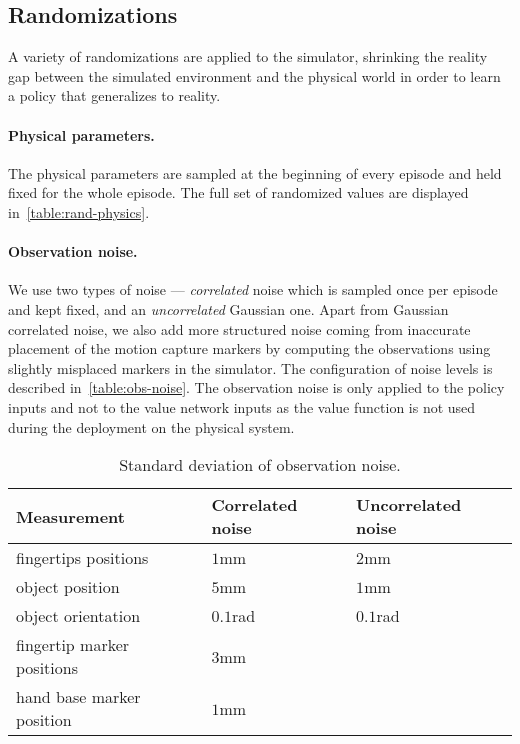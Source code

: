 \subsection{Randomizations}
\label{app:randomizations}

A variety of randomizations are applied to the simulator, shrinking the reality gap between the simulated environment and the physical world in order to learn a policy that generalizes to reality.


\paragraph{Physical parameters.}
The physical parameters are sampled at the beginning of every episode and held fixed for the whole episode. The full set of randomized values are displayed in~\autoref{table:rand-physics}.


\paragraph{Observation noise.}
We use two types of noise ---
\textit{correlated} noise which is sampled once per episode and kept fixed,
and an \textit{uncorrelated} Gaussian one.
Apart from Gaussian correlated noise, we also add more structured noise
coming from inaccurate placement of the motion capture markers
by computing the observations using slightly misplaced
markers in the simulator.
The configuration of noise levels is described in~\autoref{table:obs-noise}.
The observation noise is only applied to the policy inputs and not to
the value network inputs as the value function is not used during the deployment on the physical system.







\begin{table}
    \footnotesize
    \centering
    \caption{Standard deviation of observation noise.}
    \renewcommand{\arraystretch}{1.3}
    \begin{tabular}{@{}lll@{}}
        \toprule
        \textbf{Measurement} & \textbf{Correlated noise} & \textbf{Uncorrelated noise} \\ \midrule
        fingertips positions & $1$mm & $2$mm \\
        object position & $5$mm & $1$mm \\
        object orientation & $0.1$rad & $0.1$rad \\ \hline
        fingertip marker positions & $3$mm & \\
        hand base marker position & $1$mm & \\
        \bottomrule
    \end{tabular}
\label{table:obs-noise}
\end{table}

